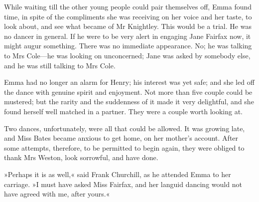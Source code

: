While waiting till the other young people could pair themselves off, Emma found time, in spite of the compliments she was receiving on her voice and her taste, to look about, and see what became of Mr Knightley. This would be a trial. He was no dancer in general. If he were to be very alert in engaging Jane Fairfax now, it might augur something. There was no immediate appearance. No; he was talking to Mrs Cole—he was looking on unconcerned; Jane was asked by somebody else, and he was still talking to Mrs Cole.

Emma had no longer an alarm for Henry; his interest was yet safe; and she led off the dance with genuine spirit and enjoyment. Not more than five couple could be mustered; but the rarity and the suddenness of it made it very delightful, and she found herself well matched in a partner. They were a couple worth looking at.

Two dances, unfortunately, were all that could be allowed. It was growing late, and Miss Bates became anxious to get home, on her mother's account. After some attempts, therefore, to be permitted to begin again, they were obliged to thank Mrs Weston, look sorrowful, and have done.

»Perhaps it is as well,« said Frank Churchill, as he attended Emma to her carriage. »I must have asked Miss Fairfax, and her languid dancing would not have agreed with me, after yours.«